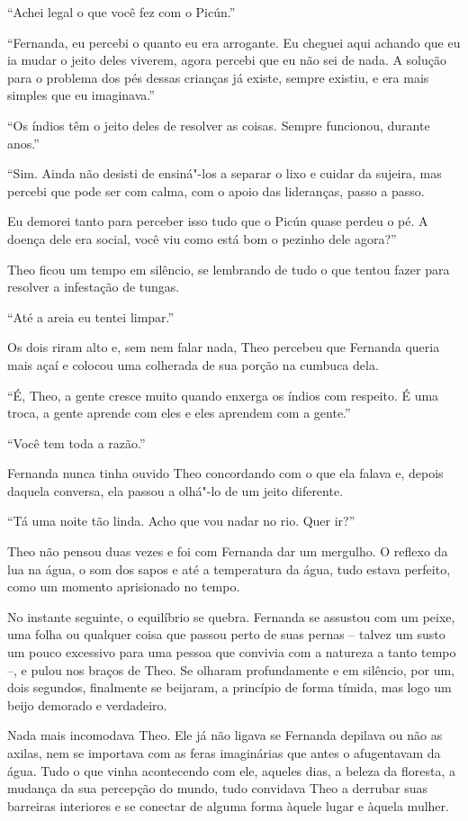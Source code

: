 ``Achei legal o que você fez com o Picún.''

``Fernanda, eu percebi o quanto eu era arrogante. Eu cheguei aqui
achando que eu ia mudar o jeito deles viverem, agora percebi que eu não
sei de nada. A solução para o problema dos pés dessas crianças já
existe, sempre existiu, e era mais simples que eu imaginava.''

``Os índios têm o jeito deles de resolver as coisas. Sempre funcionou,
durante anos.''

``Sim. Ainda não desisti de ensiná"-los a separar o lixo e cuidar da
sujeira, mas percebi que pode ser com calma, com o apoio das lideranças,
passo a passo.

Eu demorei tanto para perceber isso tudo que o Picún quase perdeu o pé.
A doença dele era social, você viu como está bom o pezinho dele agora?''

Theo ficou um tempo em silêncio, se lembrando de tudo o que tentou fazer
para resolver a infestação de tungas.

``Até a areia eu tentei limpar.''

Os dois riram alto e, sem nem falar nada, Theo percebeu que Fernanda
queria mais açaí e colocou uma colherada de sua porção na cumbuca dela.

``É, Theo, a gente cresce muito quando enxerga os índios com respeito. É
uma troca, a gente aprende com eles e eles aprendem com a gente.''

``Você tem toda a razão.''

Fernanda nunca tinha ouvido Theo concordando com o que ela falava e,
depois daquela conversa, ela passou a olhá"-lo de um jeito diferente.

``Tá uma noite tão linda. Acho que vou nadar no rio. Quer ir?''

Theo não pensou duas vezes e foi com Fernanda dar um mergulho. O
reflexo da lua na água, o som dos sapos e até a temperatura da água,
tudo estava perfeito, como um momento aprisionado no tempo.

No instante seguinte, o equilíbrio se quebra. Fernanda se assustou com
um peixe, uma folha ou qualquer coisa que passou perto de suas pernas --
talvez um susto um pouco excessivo para uma pessoa que convivia com a
natureza a tanto tempo --, e pulou nos braços de Theo. Se olharam
profundamente e em silêncio, por um, dois segundos, finalmente se
beijaram, a princípio de forma tímida, mas logo um beijo demorado e
verdadeiro.

Nada mais incomodava Theo. Ele já não ligava se Fernanda depilava ou não
as axilas, nem se importava com as feras imaginárias que antes o
afugentavam da água. Tudo o que vinha acontecendo com ele, aqueles dias,
a beleza da floresta, a mudança da sua percepção do mundo, tudo
convidava Theo a derrubar suas barreiras interiores e se conectar de
alguma forma àquele lugar e àquela mulher.

